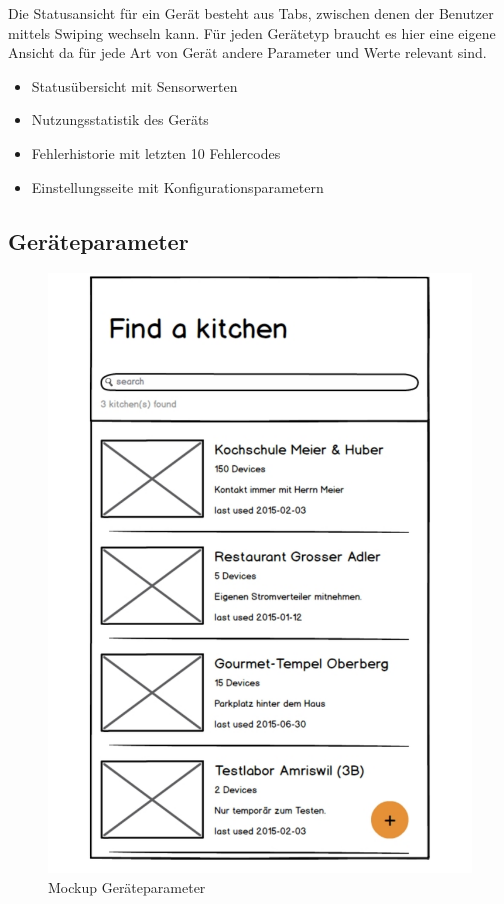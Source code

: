 Die Statusansicht für ein Gerät besteht aus Tabs, zwischen denen der Benutzer mittels Swiping wechseln kann. Für jeden Gerätetyp braucht es hier eine eigene Ansicht da für jede Art von Gerät andere Parameter und Werte relevant sind.

\begin{itemize}
  \item Statusübersicht mit Sensorwerten
  \item Nutzungsstatistik des Geräts
  \item Fehlerhistorie mit letzten 10 Fehlercodes
  \item Einstellungsseite mit Konfigurationsparametern
\end{itemize}

\vspace{6cm}
\WFclear

\subsection{Geräteparameter}
\label{subsec:Geräteparameter}

\begin{figure}
	\begin{center}
		\includegraphics[page=6,trim=0 0 0 0,clip,scale=0.21]{uiux/res/mockups}
		\caption{Mockup Geräteparameter}
		\label{abb:mockDeviceParams}
	\end{center}
\end{figure}

